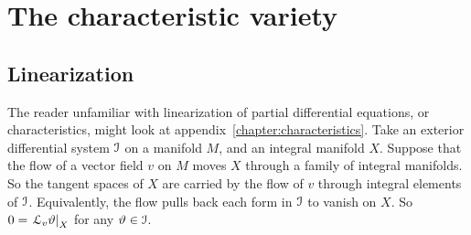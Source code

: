 \chapter{The characteristic variety}
\section{Linearization}\label{section:linearization}
The reader unfamiliar with linearization of partial differential equations, or characteristics, might look at appendix~\ref{chapter:characteristics}.
Take an exterior differential system \(\mathcal{I}\) on a manifold \(M\), and an integral manifold \(X\).
Suppose that the flow of a vector field \(v\) on \(M\) moves \(X\) through a family of integral manifolds.
So the tangent spaces of \(X\) are carried by the flow of \(v\) through integral elements of \(\mathcal{I}\).
Equivalently, the flow pulls back each form in \(\mathcal{I}\) to vanish on \(X\).
So \(0=\left.\EuScript L_v \vartheta\right|_X\) for any \(\vartheta \in \mathcal{I}\).

